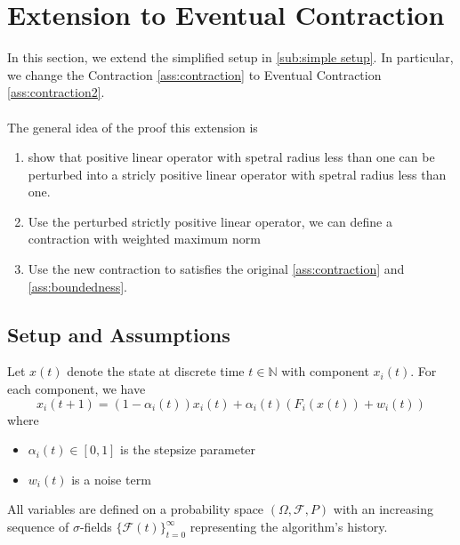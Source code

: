 \newpage
\section{Extension to Eventual Contraction}\label{sec:2}
In this section, we extend the simplified setup in \autoref{sub:simple setup}. In particular, we change the Contraction \autoref{ass:contraction} to Eventual Contraction \autoref{ass:contraction2}.\\
\\
The general idea of the proof this extension is
\begin{enumerate}
    \item show that positive linear operator with spetral radius less than one can be perturbed into a stricly positive linear operator with spetral radius less than one.
    \item Use the perturbed strictly positive linear operator, we can define a contraction with weighted maximum norm
    \item Use the new contraction to satisfies the original \autoref{ass:contraction} and \autoref{ass:boundedness}.
\end{enumerate}
\subsection{Setup and Assumptions}
Let $x(t)$ denote the state at discrete time $t\in\mathbb{N}$ with component $x_i(t)$. For each component, we have
$$
x_i(t+1) = (1-\alpha_i(t))x_i(t) + \alpha_i(t)(F_i(x(t)) + w_i(t)) 
$$
where
\begin{itemize}
    \item $\alpha_i(t) \in [0,1]$ is the stepsize parameter
    \item $w_i(t)$ is a noise term
\end{itemize}
All variables are defined on a probability space $(\Omega, \mathcal{F}, P)$ with an increasing sequence of $\sigma$-fields $\{\mathcal{F}(t)\}_{t=0}^{\infty}$ representing the algorithm's history. \\
\\

